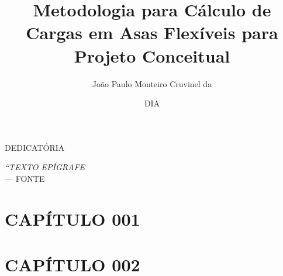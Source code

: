 \documentclass[mscprof]{ita}    %
\author{João Paulo Monteiro Cruvinel da}{Costa}
\title{Metodologia para Cálculo de Cargas em Asas Flexíveis para Projeto Conceitual}
\date{DIA}{MÊS}{ANO}
\begin{document}
    \maketitle

    \begin{itadedication}
        DEDICATÓRIA
    \end{itadedication}

    \begin{itathanks}
    
    \end{itathanks}

    \thispagestyle{empty}
    \ifhyperref{}\fi
    \begin{flushright}
    \begin{spacing}{1}
    \mbox{}\vfill
    {\sffamily\itshape
    ``TEXTO EPÍGRAFE\\}
    --- \textsc{FONTE}
    \end{spacing}
    \end{flushright}

    \begin{abstract}
    \noindent
    
    \end{abstract}

    \begin{englishabstract}
    \noindent
    
    \end{englishabstract}

    \listoffigures %

    \listoftables %

    \listofabbreviations

    \listofsymbols

    \tableofcontents

    \mainmatter

    \chapter{CAPÍTULO 001}
    

    \chapter{CAPÍTULO 002}
    
\end{document}
